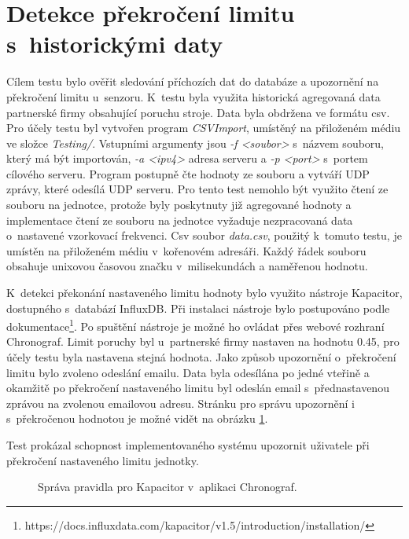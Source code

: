 \section{Detekce překročení limitu s~historickými daty}
Cílem testu bylo ověřit sledování příchozích dat do databáze a upozornění na překročení limitu u~senzoru. K~testu byla využita historická agregovaná data partnerské firmy obsahující poruchu stroje. Data byla obdržena ve formátu csv. Pro účely testu byl vytvořen program \textit{CSVImport}, umístěný na přiloženém médiu ve složce \textit{Testing/}. Vstupními argumenty jsou \textit{-f <soubor>} s~názvem souboru, který má být importován, \textit{-a <ipv4>} adresa serveru a \textit{-p <port>} s~portem cílového serveru. Program postupně čte hodnoty ze souboru a vytváří UDP zprávy, které odesílá UDP serveru. Pro tento test nemohlo být využito čtení ze souboru na jednotce, protože byly poskytnuty již agregované hodnoty a implementace čtení ze souboru na jednotce vyžaduje nezpracovaná data o~nastavené vzorkovací frekvenci. Csv soubor \textit{data.csv}, použitý k~tomuto testu, je umístěn na přiloženém médiu v~kořenovém adresáři. Každý řádek souboru obsahuje unixovou časovou značku v~milisekundách a naměřenou hodnotu.

K~detekci překonání nastaveného limitu hodnoty bylo využito nástroje Kapacitor, dostupného s~databází InfluxDB. Při instalaci nástroje bylo postupováno podle dokumentace\footnote{https://docs.influxdata.com/kapacitor/v1.5/introduction/installation/}. Po spuštění nástroje je možné ho ovládat přes webové rozhraní Chronograf. Limit poruchy byl u~partnerské firmy nastaven na hodnotu 0.45, pro účely testu byla nastavena stejná hodnota. Jako způsob upozornění o~překročení limitu bylo zvoleno odeslání emailu. Data byla odesílána po jedné vteřině a okamžitě po překročení nastaveného limitu byl odeslán email s~přednastavenou zprávou na zvolenou emailovou adresu. Stránku pro správu upozornění i s~překročenou hodnotou je možné vidět na obrázku \ref{pic:alert}. 

Test prokázal schopnost implementovaného systému upozornit uživatele při překročení nastaveného limitu jednotky. 

\begin{figure}[h]
  \centering
  \caption{Správa pravidla pro Kapacitor v~aplikaci Chronograf.}\label{pic:alert}
\end{figure}

